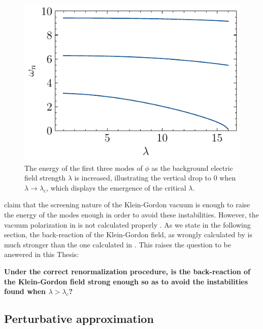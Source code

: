 \begin{figure}[t]
	\centering
	\includegraphics[width=1\textwidth]{figures/dirichlet/eigenvaluesExternalFieldApproximation.pdf}
\caption{The energy of the first three modes of $\phi$ as the background electric field strength $\lambda$ is increased, illustrating the vertical drop to 0 when $\lambda\to \lambda_c$, which displays the emergence of the critical $\lambda$.}
	\label{fig:figures-eigenvalues-external-field-approximation-png}
\end{figure}

\cite{Ambj1983} claim that the screening nature of the Klein-Gordon vacuum is enough to raise the energy of the modes enough in order to avoid these instabilities. However, the vacuum polarization in \cite{Ambj1983} is not calculated properly \cite{Wernersson2020}. As we state in the following section, the back-reaction of the Klein-Gordon field, as wrongly calculated by \cite{Ambj1983} is much stronger than the one calculated in \cite{Wernersson2020}. This raises the question to be answered in this Thesis: 
\begin{center}
    \textbf{Under the correct renormalization procedure, is the back-reaction of the Klein-Gordon field strong enough so as to avoid the instabilities found when $\lambda > \lambda_c$?}
\end{center}

\subsection{Perturbative approximation}

